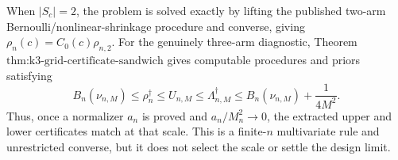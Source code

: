 When \(|S_c|=2\), the problem is solved exactly by lifting the published two-arm Bernoulli/nonlinear-shrinkage procedure and converse, giving \(\rho_n(c)=C_0(c)\rho_{n,2}\).  For the genuinely three-arm diagnostic, Theorem \(\text{thm:k3-grid-certificate-sandwich}\) gives computable procedures and priors satisfying
\[
 B_n(\nu_{n,M})\leq\rho_n^\dagger\leq U_{n,M}
 \leq\Lambda_{n,M}^\dagger
 \leq B_n(\nu_{n,M})+\frac1{4M^2}.
\]
Thus, once a normalizer \(a_n\) is proved and \(a_n/M_n^2\to0\), the extracted upper and lower certificates match at that scale.  This is a finite-\(n\) multivariate rule and unrestricted converse, but it does not select the scale or settle the design limit.